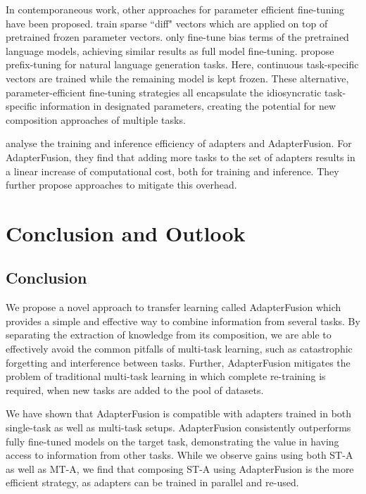 In contemporaneous work, other approaches for parameter efficient fine-tuning have been proposed. 
\citet{Guo2020DiffPruning} train sparse ``diff" vectors which are applied on top of pretrained frozen parameter vectors. 
\citet{ravfogel2021bitfit} only fine-tune bias terms of the pretrained language models, achieving similar results as full model fine-tuning.
\citet{li2021prefix} propose prefix-tuning for natural language generation tasks. Here, continuous task-specific vectors are trained while  the remaining model is kept frozen. These alternative, parameter-efficient fine-tuning strategies all encapsulate the idiosyncratic task-specific information in designated parameters, creating the potential for new composition approaches of multiple tasks. 

\citet{rueckle2020adapterdrop} analyse the training and inference efficiency of adapters and AdapterFusion. For AdapterFusion, they find that adding more tasks to the set of adapters results in a linear increase of computational cost, both for training and inference. They further propose approaches to mitigate this overhead. 

\section{Conclusion and Outlook}

\subsection{Conclusion}
\label{conclusion}
We propose a novel approach to transfer learning called AdapterFusion which provides a simple and effective way to combine information from several tasks. By separating the extraction of knowledge from its composition, we are able to effectively avoid the common pitfalls of multi-task learning, such as catastrophic forgetting and interference between tasks. Further, AdapterFusion mitigates the problem of traditional multi-task learning in which complete re-training is required, when new tasks are added to the pool of datasets.

We have shown that AdapterFusion is compatible with adapters trained in both single-task as well as multi-task setups. AdapterFusion consistently outperforms fully fine-tuned models  on the target task, demonstrating the value in having access to information from other tasks. While we observe gains using both ST-A as well as MT-A, we find that composing ST-A using AdapterFusion is the more efficient strategy, as adapters can be trained in parallel and re-used.

